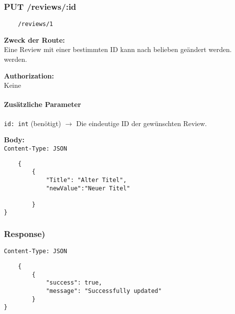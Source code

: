 \pagebreak


\subsubsection{PUT /reviews/:id}

\begin{lstlisting}
    /reviews/1
\end{lstlisting}

\textbf{Zweck der Route:} \\
Eine Review mit einer bestimmten ID kann nach belieben geändert werden.
werden.

\textbf{Authorization:} \\
Keine

\paragraph{Zusätzliche Parameter}
\lstinline{id: int} (benötigt)
$\rightarrow$ Die eindeutige ID der gewünschten Review.

\textbf{Body:}\\
\lstinline{Content-Type: JSON}
\begin{lstlisting}
    {
        {
            "Title": "Alter Titel",
            "newValue":"Neuer Titel"

        }
}
\end{lstlisting}

\subsubsection{Response)}

\lstinline{Content-Type: JSON}
\begin{lstlisting}
    {
        {
            "success": true,
            "message": "Successfully updated"
        }
}
\end{lstlisting}

\pagebreak

